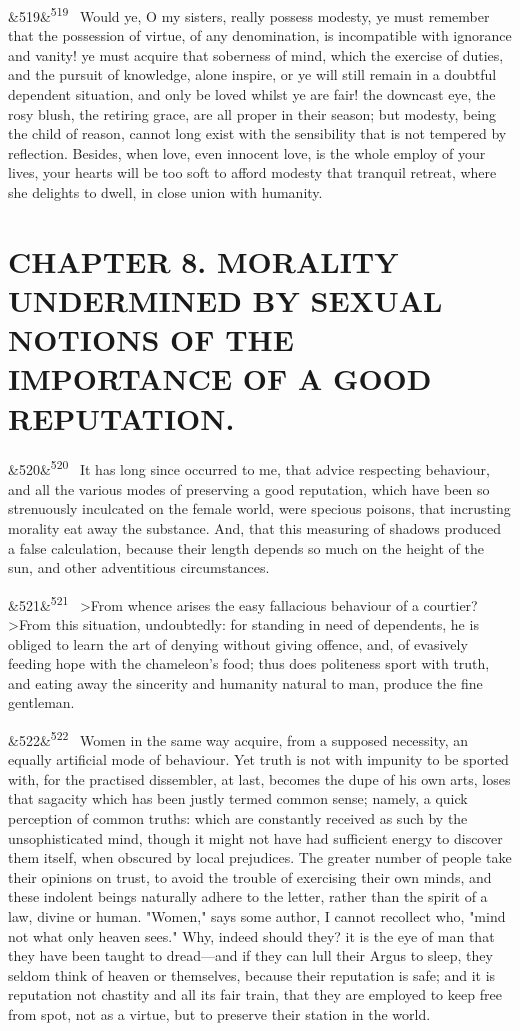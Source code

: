 \documentclass[12pt]{article}
\newcommand{\para}[1][]{\par\noindent\ifx&#1&\else\textsuperscript{\footnotesize #1}~\fi}
\begin{document}
\para[519] Would ye, O my sisters, really possess modesty, ye must remember that the possession of virtue, of any denomination, is incompatible with ignorance and vanity! ye must acquire that soberness of mind, which the exercise of duties, and the pursuit of knowledge, alone inspire, or ye will still remain in a doubtful dependent situation, and only be loved whilst ye are fair! the downcast eye, the rosy blush, the retiring grace, are all proper in their season; but modesty, being the child of reason, cannot long exist with the sensibility that is not tempered by reflection. Besides, when love, even innocent love, is the whole employ of your lives, your hearts will be too soft to afford modesty that tranquil retreat, where she delights to dwell, in close union with humanity.

\section*{CHAPTER 8. MORALITY UNDERMINED BY SEXUAL NOTIONS OF THE IMPORTANCE OF A GOOD REPUTATION.}

\para[520] It has long since occurred to me, that advice respecting behaviour, and all the various modes of preserving a good reputation, which have been so strenuously inculcated on the female world, were specious poisons, that incrusting morality eat away the substance. And, that this measuring of shadows produced a false calculation, because their length depends so much on the height of the sun, and other adventitious circumstances.

\para[521] >From whence arises the easy fallacious behaviour of a courtier? >From this situation, undoubtedly: for standing in need of dependents, he is obliged to learn the art of denying without giving offence, and, of evasively feeding hope with the chameleon's food; thus does politeness sport with truth, and eating away the sincerity and humanity natural to man, produce the fine gentleman.

\para[522] Women in the same way acquire, from a supposed necessity, an equally artificial mode of behaviour. Yet truth is not with impunity to be sported with, for the practised dissembler, at last, becomes the dupe of his own arts, loses that sagacity which has been justly termed common sense; namely, a quick perception of common truths: which are constantly received as such by the unsophisticated mind, though it might not have had sufficient energy to discover them itself, when obscured by local prejudices. The greater number of people take their opinions on trust, to avoid the trouble of exercising their own minds, and these indolent beings naturally adhere to the letter, rather than the spirit of a law, divine or human. "Women," says some author, I cannot recollect who, "mind not what only heaven sees." Why, indeed should they? it is the eye of man that they have been taught to dread---and if they can lull their Argus to sleep, they seldom think of heaven or themselves, because their reputation is safe; and it is reputation not chastity and all its fair train, that they are employed to keep free from spot, not as a virtue, but to preserve their station in the world.
\end{document}
